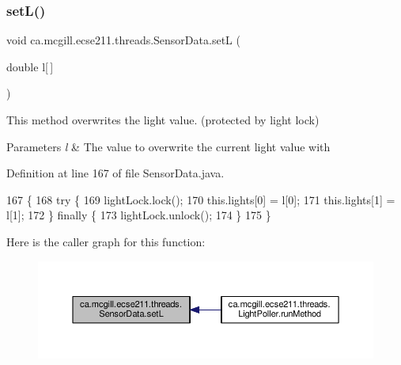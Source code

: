 \subsubsection{\texorpdfstring{set\+L()}{setL()}}
{\footnotesize\ttfamily void ca.\+mcgill.\+ecse211.\+threads.\+Sensor\+Data.\+setL (\begin{DoxyParamCaption}\item[{double}]{l\mbox{[}$\,$\mbox{]} }\end{DoxyParamCaption})}

This method overwrites the light value. (protected by light lock)


\begin{DoxyParams}{Parameters}
{\em l} & The value to overwrite the current light value with \\
\hline
\end{DoxyParams}


Definition at line 167 of file Sensor\+Data.\+java.


\begin{DoxyCode}
167                                \{
168     \textcolor{keywordflow}{try} \{
169       lightLock.lock();
170       this.lights[0] = l[0];
171       this.lights[1] = l[1];
172     \} \textcolor{keywordflow}{finally} \{
173       lightLock.unlock();
174     \}
175   \}
\end{DoxyCode}
Here is the caller graph for this function\+:\nopagebreak
\begin{figure}[H]
\begin{center}
\leavevmode
\includegraphics[width=350pt]{classca_1_1mcgill_1_1ecse211_1_1threads_1_1_sensor_data_af905a6f2825716ae1a39bf7f6be09477_icgraph}
\end{center}
\end{figure}
\mbox{\label{classca_1_1mcgill_1_1ecse211_1_1threads_1_1_sensor_data_a6ad23111ecd378099f0b4ed0b6d398bc}} 
